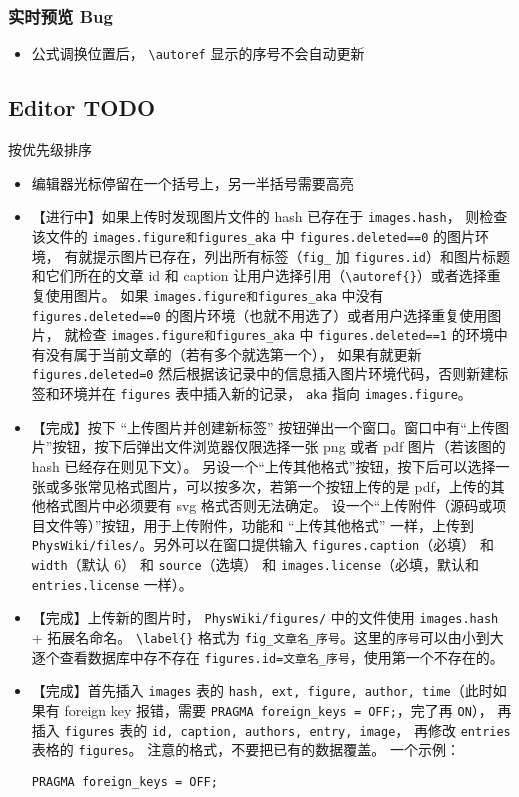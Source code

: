 \subsubsection{实时预览 Bug}
\begin{itemize}
\item 公式调换位置后， \verb`\autoref` 显示的序号不会自动更新
\end{itemize}

\subsection{Editor TODO}\label{sub_edTODO_2}
按优先级排序
\begin{itemize}
\item 编辑器光标停留在一个括号上，另一半括号需要高亮
\item 【进行中】如果上传时发现图片文件的 hash 已存在于 \verb`images.hash`， 则检查该文件的 \verb`images.figure和figures_aka` 中 \verb`figures.deleted==0` 的图片环境， 有就提示图片已存在，列出所有标签（\verb`fig_` 加 \verb`figures.id`）和图片标题和它们所在的文章 id 和 caption 让用户选择引用（\verb`\autoref{}`）或者选择重复使用图片。 如果 \verb`images.figure和figures_aka` 中没有 \verb`figures.deleted==0` 的图片环境（也就不用选了）或者用户选择重复使用图片， 就检查 \verb`images.figure和figures_aka` 中 \verb`figures.deleted==1` 的环境中有没有属于当前文章的（若有多个就选第一个）， 如果有就更新 \verb`figures.deleted=0` 然后根据该记录中的信息插入图片环境代码，否则新建标签和环境并在 \verb`figures` 表中插入新的记录， \verb`aka` 指向 \verb`images.figure`。
\item 【完成】按下 “上传图片并创建新标签” 按钮弹出一个窗口。窗口中有“上传图片”按钮，按下后弹出文件浏览器仅限选择一张 png 或者 pdf 图片（若该图的 hash 已经存在则见下文）。 另设一个“上传其他格式”按钮，按下后可以选择一张或多张常见格式图片，可以按多次，若第一个按钮上传的是 pdf，上传的其他格式图片中必须要有 svg 格式否则无法确定。 设一个“上传附件（源码或项目文件等）”按钮，用于上传附件，功能和 “上传其他格式” 一样，上传到 \verb`PhysWiki/files/`。另外可以在窗口提供输入 \verb`figures.caption`（必填） 和 \verb`width`（默认 6） 和 \verb`source`（选填） 和 \verb`images.license`（必填，默认和 \verb`entries.license` 一样）。
\item 【完成】上传新的图片时， \verb`PhysWiki/figures/` 中的文件使用 \verb`images.hash` + 拓展名命名。 \verb`\label{}` 格式为 \verb`fig_文章名_序号`。这里的\verb`序号`可以由小到大逐个查看数据库中存不存在 \verb`figures.id=文章名_序号`，使用第一个不存在的。
\item 【完成】首先插入 \verb`images` 表的 \verb`hash, ext, figure, author, time`（此时如果有 foreign key 报错，需要 \verb`PRAGMA foreign_keys = OFF;`，完了再 \verb`ON`）， 再插入 \verb`figures` 表的 \verb`id, caption, authors, entry, image`， 再修改 \verb`entries` 表格的 \verb`figures`。 注意的格式，不要把已有的数据覆盖。 一个示例：
\begin{lstlisting}[language=none]
PRAGMA foreign_keys = OFF;


\end{lstlisting}
\end{itemize}
